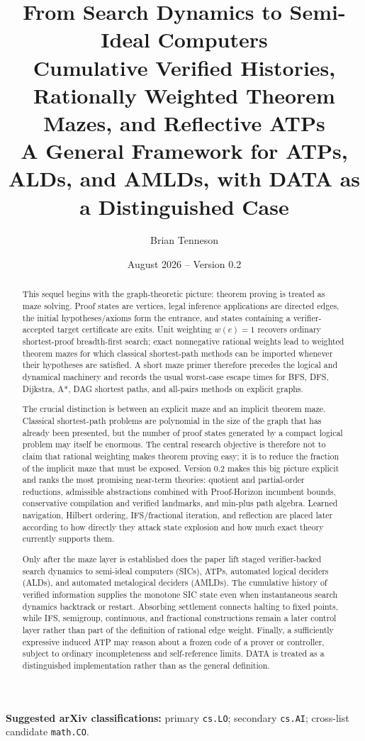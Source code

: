 \documentclass[11pt]{article}
\title{\textbf{From Search Dynamics to Semi-Ideal Computers}\\[0.4em]
\Large Cumulative Verified Histories, Rationally Weighted Theorem Mazes, and Reflective ATPs\\[0.6em]
\large A General Framework for ATPs, ALDs, and AMLDs, with DATA as a Distinguished Case}
\author{Brian Tenneson}
\date{August 2026 -- Version 0.2}
\theoremstyle{remark}
\begin{document}
\maketitle

\begin{center}
\textbf{Suggested arXiv classifications:} primary \texttt{cs.LO}; secondary \texttt{cs.AI}; cross-list candidate \texttt{math.CO}.
\end{center}

\begin{abstract}
This sequel begins with the graph-theoretic picture: theorem proving is treated as maze solving. Proof states are vertices, legal inference applications are directed edges, the initial hypotheses/axioms form the entrance, and states containing a verifier-accepted target certificate are exits. Unit weighting $w(e)=1$ recovers ordinary shortest-proof breadth-first search; exact nonnegative rational weights lead to weighted theorem mazes for which classical shortest-path methods can be imported whenever their hypotheses are satisfied. A short maze primer therefore precedes the logical and dynamical machinery and records the usual worst-case escape times for BFS, DFS, Dijkstra, A*, DAG shortest paths, and all-pairs methods on explicit graphs.

The crucial distinction is between an explicit maze and an implicit theorem maze. Classical shortest-path problems are polynomial in the size of the graph that has already been presented, but the number of proof states generated by a compact logical problem may itself be enormous. The central research objective is therefore not to claim that rational weighting makes theorem proving easy; it is to reduce the fraction of the implicit maze that must be exposed. Version 0.2 makes this big picture explicit and ranks the most promising near-term theories: quotient and partial-order reductions, admissible abstractions combined with Proof-Horizon incumbent bounds, conservative compilation and verified landmarks, and min-plus path algebra. Learned navigation, Hilbert ordering, IFS/fractional iteration, and reflection are placed later according to how directly they attack state explosion and how much exact theory currently supports them.

Only after the maze layer is established does the paper lift staged verifier-backed search dynamics to semi-ideal computers (SICs), ATPs, automated logical deciders (ALDs), and automated metalogical deciders (AMLDs). The cumulative history of verified information supplies the monotone SIC state even when instantaneous search dynamics backtrack or restart. Absorbing settlement connects halting to fixed points, while IFS, semigroup, continuous, and fractional constructions remain a later control layer rather than part of the definition of rational edge weight. Finally, a sufficiently expressive induced ATP may reason about a frozen code of a prover or controller, subject to ordinary incompleteness and self-reference limits. DATA is treated as a distinguished implementation rather than as the general definition.
\end{abstract}
\end{document}
